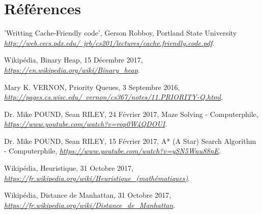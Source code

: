 \documentclass[10pt]{article}
\begin{document}
	\section{Références}
		\begin{thebibliography}{}
		
				'Writting Cache-Friendly code', Gerson Robboy, Portland State University\newline
				\href{http://web.cecs.pdx.edu/~jrb/cs201/lectures/cache.friendly.code.pdf}
				      {\textit{http://web.cecs.pdx.edu/~jrb/cs201/lectures/cache.friendly.code.pdf}}.
				      
				Wikipédia, Binary Heap, 15 Décembre 2017,\newline
				\href{https://en.wikipedia.org/wiki/Binary\_heap}
				      {\textit{https://en.wikipedia.org/wiki/Binary\_heap}}.

				Mary K. VERNON, Priority Queues, 3 Septembre 2016,\newline
				\href{http://pages.cs.wisc.edu/~vernon/cs367/notes/11.PRIORITY-Q.html}
					{\textit{http://pages.cs.wisc.edu/~vernon/cs367/notes/11.PRIORITY-Q.html}}.
		
				Dr. Mike POUND, Sean RILEY, 24 Février 2017,\newline
				Maze Solving - Computerphile,\newline
				\href{https://www.youtube.com/watch?v=rop0W4QDOUI}{\textit{https://www.youtube.com/watch?v=rop0W4QDOUI}}.
				
				Dr. Mike POUND, Sean RILEY, 15 Février 2017,\newline
				A* (A Star) Search Algorithm - Computerphile,\newline
				\href{https://www.youtube.com/watch?v=ySN5Wnu88nE}{\textit{https://www.youtube.com/watch?v=ySN5Wnu88nE}}.

				Wikipédia, Heuristique, 31 Octobre 2017,\newline
				\href{https://fr.wikipedia.org/wiki/Heuristique_(mathématiques)}
				      {\textit{https://fr.wikipedia.org/wiki/Heuristique\_(mathématiques)}}.
				      
				Wikipédia, Distance de Manhattan, 31 Octobre 2017,\newline
				\href{https://fr.wikipedia.org/wiki/Distance_de_Manhattan}
				      {\textit{https://fr.wikipedia.org/wiki/Distance\_de\_Manhattan}}.

  \end{thebibliography}
\end{document}
